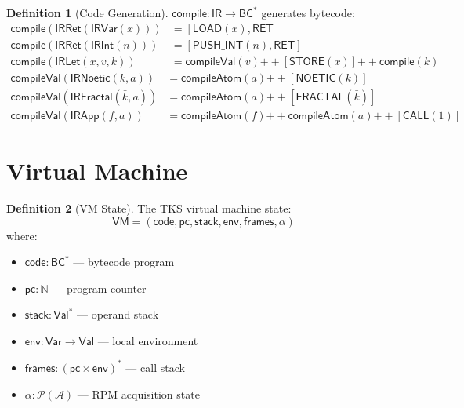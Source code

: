 \documentclass[11pt,twoside,openright]{book}
\theoremstyle{definition}
\newtheorem{definition}{Definition}[chapter]
\theoremstyle{plain}
\theoremstyle{remark}
\newcommand{\Acquisitions}{\mathcal{A}}
\newcommand{\IR}{\mathsf{IR}}                %
\newcommand{\BC}{\mathsf{BC}}                %
\newcommand{\VM}{\mathsf{VM}}                %
\begin{document}
\begin{definition}[Code Generation]
\label{def:codegen}
$\mathsf{compile} : \IR \to \BC^*$ generates bytecode:
\begin{align}
\mathsf{compile}(\mathsf{IRRet}(\mathsf{IRVar}(x))) &= [\mathsf{LOAD}(x), \mathsf{RET}] \\
\mathsf{compile}(\mathsf{IRRet}(\mathsf{IRInt}(n))) &= [\mathsf{PUSH\_INT}(n), \mathsf{RET}] \\
\mathsf{compile}(\mathsf{IRLet}(x, v, k)) &= \mathsf{compileVal}(v) \mathbin{++} [\mathsf{STORE}(x)] \mathbin{++} \mathsf{compile}(k)
\end{align}
\begin{align}
\mathsf{compileVal}(\mathsf{IRNoetic}(k, a)) &= \mathsf{compileAtom}(a) \mathbin{++} [\mathsf{NOETIC}(k)] \\
\mathsf{compileVal}(\mathsf{IRFractal}(\bar{k}, a)) &= \mathsf{compileAtom}(a) \mathbin{++} [\mathsf{FRACTAL}(\bar{k})] \\
\mathsf{compileVal}(\mathsf{IRApp}(f, a)) &= \mathsf{compileAtom}(f) \mathbin{++} \mathsf{compileAtom}(a) \mathbin{++} [\mathsf{CALL}(1)]
\end{align}
\end{definition}

\section{Virtual Machine}

\begin{definition}[VM State]
\label{def:vm-state}
The TKS virtual machine state:
\[
\VM = (\mathsf{code}, \mathsf{pc}, \mathsf{stack}, \mathsf{env}, \mathsf{frames}, \alpha)
\]
where:
\begin{itemize}
  \item $\mathsf{code} : \BC^*$ --- bytecode program
  \item $\mathsf{pc} : \mathbb{N}$ --- program counter
  \item $\mathsf{stack} : \mathsf{Val}^*$ --- operand stack
  \item $\mathsf{env} : \mathsf{Var} \to \mathsf{Val}$ --- local environment
  \item $\mathsf{frames} : (\mathsf{pc} \times \mathsf{env})^*$ --- call stack
  \item $\alpha : \mathcal{P}(\Acquisitions)$ --- RPM acquisition state
\end{itemize}
\end{definition}
\end{document}
